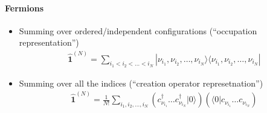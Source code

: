 \documentclass[letterpaper,10pt,english]{jupyterBook}
\begin{document}
\paragraph{Fermions}
\label{\detokenize{ch/quantum-mechanics/many-body/quantum-fields:fermions}}
\sphinxAtStartPar
{}
\begin{itemize}
\item {} 
\sphinxAtStartPar
Summing over ordered/independent configurations (“occupation representation”)
\begin{equation*}
\begin{split}\hat{\mathbf{1}}^{(N)} = \sum_{i_1 < i_2 < \dots < i_N} | \nu_{i_1}, \nu_{i_2}, \dots, \nu_{i_N} \rangle \langle \nu_{i_1}, \nu_{i_2}, \dots, \nu_{i_N} |\end{split}
\end{equation*}
\item {} 
\sphinxAtStartPar
Summing over all the indices (“creation operator represetnation”)
\begin{equation*}
\begin{split}\hat{\mathbf{1}}^{(N)} = \frac{1}{N!} \sum_{i_1, i_2, \dots, i_N} \left( c_{\nu_{i_1}}^{\dagger} \dots c_{\nu_{i_N}}^{\dagger} | 0 \rangle \right) \left( \langle 0 | c_{\nu_{i_1}} \dots c_{\nu_{i_N}} \right)\end{split}
\end{equation*}
\end{itemize}

\sphinxstepscope
\end{document}
